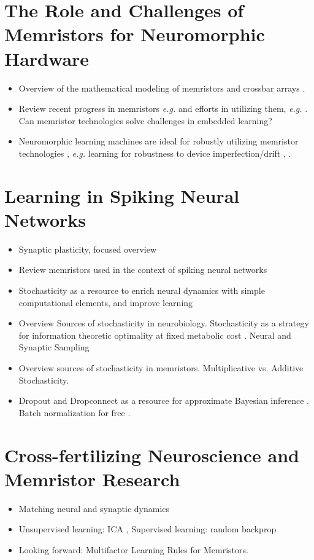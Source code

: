 \documentclass[english]{article}
\renewcommand{\cite}{\citep}
\begin{document}
\section{The Role and Challenges of Memristors for Neuromorphic Hardware}
\begin{itemize}
  \item Overview of the mathematical modeling of memristors \cite{Radwan_Fouda16_mathmode} and crossbar arrays \cite{Fouda_etal18_modeanal}.
  \item Review recent progress in memristors \emph{e.g.} \cite{Kim_etal17_remoepit} and efforts in utilizing them, \emph{e.g.} \cite{Chen_etal15_mitieffe}. Can memristor technologies solve challenges in embedded learning?
  \item Neuromorphic learning machines are ideal for robustly utilizing memristor technologies \cite{Neftci18_datapowe}, \emph{e.g.} learning for robustness to device imperfection/drift \cite{Serb_etal16_unsulear}, \cite{Querlioz_etal15_bioiprog}.   
\end{itemize}

\section{Learning in Spiking Neural Networks}
\begin{itemize}
  \item Synaptic plasticity, focused overview
  \item Review memristors used in the context of spiking neural networks \cite{Bill_Legenstein14_compmemr,Mostafa_etal15_implspik,Querlioz_etal15_bioiprog}
  \item Stochasticity as a resource to enrich neural dynamics with simple computational elements, and improve learning
  \item Overview Sources of stochasticity in neurobiology. Stochasticity as a strategy for information theoretic optimality at fixed metabolic cost \cite{Harris_etal12_synaener}. Neural and Synaptic Sampling \cite{Fiser_etal10_statopti}
  \item Overview sources of stochasticity in memristors. Multiplicative vs. Additive Stochasticity.
  \item Dropout and Dropconnect as a resource for approximate Bayesian inference \cite{Neftci17_stocsyna,Gal_Ghahramani15_dropas}. Batch normalization for free \cite{Neftci17_stocsyna}.
\end{itemize}

\section{Cross-fertilizing Neuroscience and Memristor Research}
\begin{itemize}
  \item Matching neural and synaptic dynamics \cite{Neftci18_datapowe}
  \item Unsupervised learning: ICA \cite{Fouda_etal18_indecomp}, Supervised learning: random backprop \cite{Neftci_etal17_evenrand}
  \item Looking forward: Multifactor Learning Rules for Memristors. 
\end{itemize}
\end{document}
